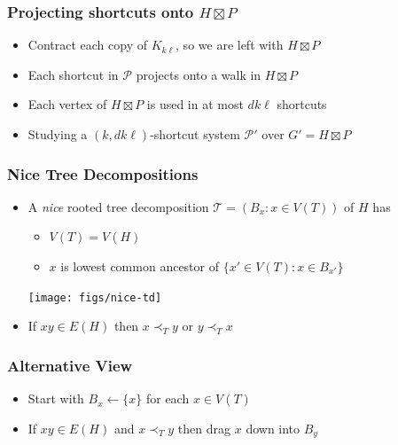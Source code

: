 \documentclass[xcolor=dvipsnames]{beamer}
\begin{document}
\begin{frame}
  \frametitle{Projecting shortcuts onto $H\boxtimes P$}
    
  \begin{itemize}
    \item Contract each copy of $K_{k\ell}$, so we are left with $H\boxtimes P$
    \item Each shortcut in $\mathcal{P}$ projects onto a walk in $H\boxtimes P$
    \item Each vertex of $H\boxtimes P$ is used in at most $dk\ell$ shortcuts
    \item Studying a $(k,dk\ell)$-shortcut system $\mathcal{P'}$ over $G'=H\boxtimes P$
  \end{itemize}
\end{frame}


\begin{frame}
  \frametitle{Nice Tree Decompositions}
  
  
  \begin{itemize}
    \item A \emph{nice} rooted tree decomposition $\mathcal{T}=(B_x:x\in V(T))$ of $H$ has 
    \begin{itemize}
      \item $V(T) = V(H)$
      \item $x$ is lowest common ancestor of $\{x'\in V(T):x\in B_{x'}\}$
    \end{itemize}
    \begin{center}
      \texttt{[image: figs/nice-td]}
    \end{center}
    \item If $xy\in E(H)$ then $x\prec_T y$ or $y\prec_T x$
  \end{itemize}
\end{frame}


\begin{frame}
  \frametitle{Alternative View}
  
  \begin{itemize}
    \item<2-> Start with $B_x\gets\{x\}$ for each $x\in V(T)$
    \item<3-> If $xy\in E(H)$ and $x\prec_T y$ then drag $x$ down into $B_y$
  \end{itemize}
  \begin{center}
  \end{center}
\end{frame}
\end{document}
